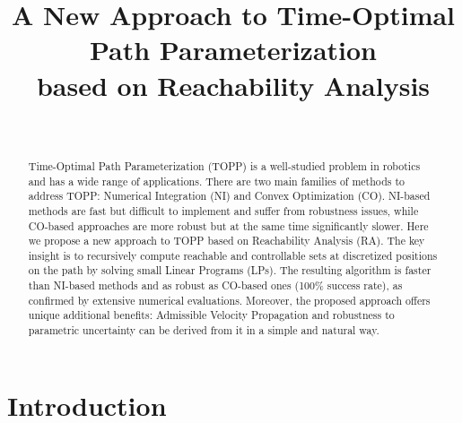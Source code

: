 \documentclass[journal]{IEEEtran}
\theoremstyle{plain}
\theoremstyle{definition}
\theoremstyle{definition}
\begin{document}
\title{\LARGE A New Approach to Time-Optimal Path Parameterization\\
  based on Reachability Analysis}

\author{\\
   }


\maketitle

\begin{abstract}
  Time-Optimal Path Parameterization (TOPP) is a well-studied problem
  in robotics and has a wide range of applications. There are two main
  families of methods to address TOPP: Numerical Integration (NI) and
  Convex Optimization (CO). NI-based methods are fast but difficult to
  implement and suffer from robustness issues, while CO-based
  approaches are more robust but at the same time significantly
  slower. Here we propose a new approach to TOPP based on Reachability
  Analysis (RA). The key insight is to recursively compute reachable
  and controllable sets at discretized positions on the path by
  solving small Linear Programs (LPs). The resulting algorithm is
  faster than NI-based methods and as robust as CO-based ones (100\%
  success rate), as confirmed by extensive numerical
  evaluations. Moreover, the proposed approach offers unique
  additional benefits: Admissible Velocity Propagation and robustness
  to parametric uncertainty can be derived from it in a simple and
  natural way.
\end{abstract}

\IEEEpeerreviewmaketitle

\section{Introduction}
\label{sec:intro}
\end{document}
